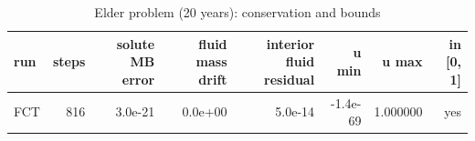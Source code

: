 \begin{table}[h]
\centering
\caption{Elder problem (20 years): conservation and bounds}
\begin{tabular}{lrrrrrrr}
\hline
run & steps & solute MB error & fluid mass drift & interior fluid residual & u min & u max & in [0, 1] \\
\hline
FCT & 816 & 3.0e-21 & 0.0e+00 & 5.0e-14 & -1.4e-69 & 1.000000 & yes \\
\hline
\end{tabular}
\end{table}
